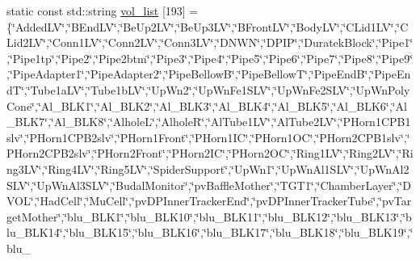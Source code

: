 \begin{DoxyCompactItemize}
static const std\-::string \hyperlink{namespace_i_map_a58ad05ea46637ad581a2d1b7fda78dc8}{vol\-\_\-list} \mbox{[}193\mbox{]} = \{\char`\"{}Added\-L\-V\char`\"{},\char`\"{}B\-End\-L\-V\char`\"{},\char`\"{}Be\-Up2\-L\-V\char`\"{},\char`\"{}Be\-Up3\-L\-V\char`\"{},\char`\"{}B\-Front\-L\-V\char`\"{},\char`\"{}Body\-L\-V\char`\"{},\char`\"{}C\-Lid1\-L\-V\char`\"{},\char`\"{}C\-Lid2\-L\-V\char`\"{},\char`\"{}Conn1\-L\-V\char`\"{},\char`\"{}Conn2\-L\-V\char`\"{},\char`\"{}Conn3\-L\-V\char`\"{},\char`\"{}D\-N\-W\-N\char`\"{},\char`\"{}D\-P\-I\-P\char`\"{},\char`\"{}Duratek\-Block\char`\"{},\char`\"{}Pipe1\char`\"{},\char`\"{}Pipe1tp\char`\"{},\char`\"{}Pipe2\char`\"{},\char`\"{}Pipe2btm\char`\"{},\char`\"{}Pipe3\char`\"{},\char`\"{}Pipe4\char`\"{},\char`\"{}Pipe5\char`\"{},\char`\"{}Pipe6\char`\"{},\char`\"{}Pipe7\char`\"{},\char`\"{}Pipe8\char`\"{},\char`\"{}Pipe9\char`\"{},\char`\"{}Pipe\-Adapter1\char`\"{},\char`\"{}Pipe\-Adapter2\char`\"{},\char`\"{}Pipe\-Bellow\-B\char`\"{},\char`\"{}Pipe\-Bellow\-T\char`\"{},\char`\"{}Pipe\-End\-B\char`\"{},\char`\"{}Pipe\-End\-T\char`\"{},\char`\"{}Tube1a\-L\-V\char`\"{},\char`\"{}Tube1b\-L\-V\char`\"{},\char`\"{}Up\-Wn2\char`\"{},\char`\"{}Up\-Wn\-Fe1\-S\-L\-V\char`\"{},\char`\"{}Up\-Wn\-Fe2\-S\-L\-V\char`\"{},\char`\"{}Up\-Wn\-Poly\-Cone\char`\"{},\char`\"{}Al\-\_\-\-B\-L\-K1\char`\"{},\char`\"{}Al\-\_\-\-B\-L\-K2\char`\"{},\char`\"{}Al\-\_\-\-B\-L\-K3\char`\"{},\char`\"{}Al\-\_\-\-B\-L\-K4\char`\"{},\char`\"{}Al\-\_\-\-B\-L\-K5\char`\"{},\char`\"{}Al\-\_\-\-B\-L\-K6\char`\"{},\char`\"{}Al\-\_\-\-B\-L\-K7\char`\"{},\char`\"{}Al\-\_\-\-B\-L\-K8\char`\"{},\char`\"{}Alhole\-L\char`\"{},\char`\"{}Alhole\-R\char`\"{},\char`\"{}Al\-Tube1\-L\-V\char`\"{},\char`\"{}Al\-Tube2\-L\-V\char`\"{},\char`\"{}P\-Horn1\-C\-P\-B1slv\char`\"{},\char`\"{}P\-Horn1\-C\-P\-B2slv\char`\"{},\char`\"{}P\-Horn1\-Front\char`\"{},\char`\"{}P\-Horn1\-I\-C\char`\"{},\char`\"{}P\-Horn1\-O\-C\char`\"{},\char`\"{}P\-Horn2\-C\-P\-B1slv\char`\"{},\char`\"{}P\-Horn2\-C\-P\-B2slv\char`\"{},\char`\"{}P\-Horn2\-Front\char`\"{},\char`\"{}P\-Horn2\-I\-C\char`\"{},\char`\"{}P\-Horn2\-O\-C\char`\"{},\char`\"{}Ring1\-L\-V\char`\"{},\char`\"{}Ring2\-L\-V\char`\"{},\char`\"{}Ring3\-L\-V\char`\"{},\char`\"{}Ring4\-L\-V\char`\"{},\char`\"{}Ring5\-L\-V\char`\"{},\char`\"{}Spider\-Support\char`\"{},\char`\"{}Up\-Wn1\char`\"{},\char`\"{}Up\-Wn\-Al1\-S\-L\-V\char`\"{},\char`\"{}Up\-Wn\-Al2\-S\-L\-V\char`\"{},\char`\"{}Up\-Wn\-Al3\-S\-L\-V\char`\"{},\char`\"{}Budal\-Monitor\char`\"{},\char`\"{}pv\-Baffle\-Mother\char`\"{},\char`\"{}T\-G\-T1\char`\"{},\char`\"{}Chamber\-Layer\char`\"{},\char`\"{}D\-V\-O\-L\char`\"{},\char`\"{}Had\-Cell\char`\"{},\char`\"{}Mu\-Cell\char`\"{},\char`\"{}pv\-D\-P\-Inner\-Tracker\-End\char`\"{},\char`\"{}pv\-D\-P\-Inner\-Tracker\-Tube\char`\"{},\char`\"{}pv\-Target\-Mother\char`\"{},\char`\"{}blu\-\_\-\-B\-L\-K1\char`\"{},\char`\"{}blu\-\_\-\-B\-L\-K10\char`\"{},\char`\"{}blu\-\_\-\-B\-L\-K11\char`\"{},\char`\"{}blu\-\_\-\-B\-L\-K12\char`\"{},\char`\"{}blu\-\_\-\-B\-L\-K13\char`\"{},\char`\"{}blu\-\_\-\-B\-L\-K14\char`\"{},\char`\"{}blu\-\_\-\-B\-L\-K15\char`\"{},\char`\"{}blu\-\_\-\-B\-L\-K16\char`\"{},\char`\"{}blu\-\_\-\-B\-L\-K17\char`\"{},\char`\"{}blu\-\_\-\-B\-L\-K18\char`\"{},\char`\"{}blu\-\_\-\-B\-L\-K19\char`\"{},\char`\"{}blu\-\_\
\end{DoxyCompactItemize}
